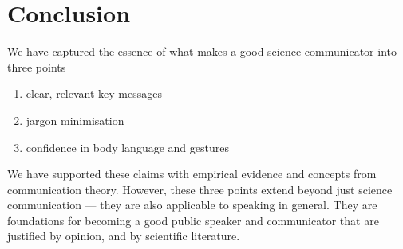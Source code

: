\section{Conclusion}

We have captured the essence of what makes a good science communicator into three points

\begin{enumerate}
	\item clear, relevant key messages
	\item jargon minimisation
	\item confidence in body language and gestures
\end{enumerate}

We have supported these claims with empirical evidence and concepts from communication theory.
However, these three points extend beyond just science communication --- they are also applicable to speaking
in general.
They are foundations for becoming a good public speaker and communicator that are justified by
opinion, and by scientific literature.
